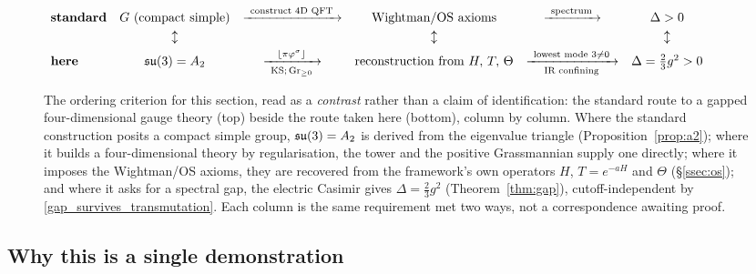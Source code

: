 \begin{figure}[!tbp]\centering\footnotesize
{\scriptsize$\begin{array}{lccccc}
\textbf{standard} & G\ \text{(compact simple)} & \xrightarrow{\ \text{construct 4D QFT}\ } & \text{Wightman/OS axioms} & \xrightarrow{\ \text{spectrum}\ } & \Delta>0\\[1mm]
 & \updownarrow & & \updownarrow & & \updownarrow\\[1mm]
\textbf{here} & \su(3)=A_2 & \xrightarrow[\ \text{KS};\,\Grpos\ ]{\ \lfloor\pi\golden^\sigma\rfloor\ } & \text{reconstruction from } H,\,T,\,\Theta & \xrightarrow[\ \text{IR confining}\ ]{\ \text{lowest mode }3\neq0\ } & \Delta=\tfrac23g^{2}>0
\end{array}$}
\caption{The ordering criterion for this section, read as a \emph{contrast} rather than a claim of
identification: the standard route to a gapped four-dimensional gauge theory (top) beside the route
taken here (bottom), column by column. Where the standard construction posits a compact simple group,
$\mathfrak{su}(3)=A_2$ is derived from the eigenvalue triangle (Proposition~\ref{prop:a2}); where it builds a
four-dimensional theory by regularisation, the tower and the positive Grassmannian supply one
directly; where it imposes the Wightman/OS axioms, they are recovered from the framework's own
operators $H$, $T=e^{-aH}$ and $\Theta$ (\S\ref{ssec:os}); and where it asks for a spectral gap, the
electric Casimir gives $\Delta=\tfrac23g^{2}$ (Theorem~\ref{thm:gap}), cutoff-independent by
\eqref{gap_survives_transmutation}. Each column is the same requirement met two ways, not a correspondence
awaiting proof.}\label{fig:claysquare}
\end{figure}

\subsection{Why this is a single demonstration}\label{ssec:spine5}

